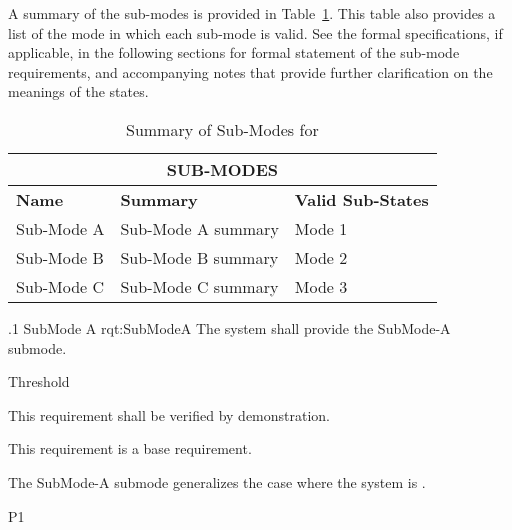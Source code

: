 
A summary of the sub-modes is provided in Table~\ref{tab:Sub-Modes}.
This table also provides a list of the mode in which each sub-mode is valid.
See the formal specifications, if applicable, in the following sections for formal statement of the sub-mode requirements, and accompanying notes that provide further clarification on the meanings of the states.
\begin{table}[htbp]
	\begin{center}
		\begin{tabular}{|p{1.0in}|p{4.0in}|p{1.0in}|}
			\hline
			\hline
			     \multicolumn{3}{|c|}{{\bf SUB-MODES}}\\
			\hline
{\bf Name} & {\bf Summary}	& {\bf Valid Sub-States}\\
			\hline
			\hline
Sub-Mode A & Sub-Mode A summary & Mode 1\\ \hline
Sub-Mode B & Sub-Mode B summary & Mode 2\\ \hline
Sub-Mode C & Sub-Mode C summary & Mode 3\\ 
			\hline
			\hline
			\end{tabular}
				\caption{Summary of Sub-Modes for \ThisSystem}
				\label{tab:Sub-Modes}
		\end{center}
\end{table}



\ONERQMTV
{\RqtNumberBase.1}
{SubMode A}
{rqt:SubModeA}
{The system shall provide the SubMode-A submode.}
{
	\item [Phase 1] Threshold
}
{This requirement shall be verified by demonstration.}
{
	\item [N/A] This requirement is a base requirement.
}
{
	\item The SubMode-A submode generalizes the case where the system is \TBD.
}
{P1}

